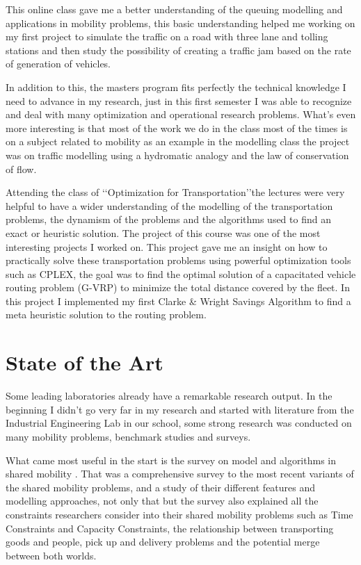 \documentclass{article}
\begin{document}
This online class gave me a better understanding of the queuing modelling and applications in mobility problems, this basic understanding helped me working on my first project to simulate the traffic on a road with three lane and tolling stations and then study the 
possibility of creating a traffic jam based on the rate of generation of vehicles.


In addition to this, the masters program fits perfectly the technical knowledge I need to advance in my research, just in this first semester I was able to recognize and deal with many optimization and operational research problems. 
What\rq{s} even more interesting is that most of the work we do in the class most of the times is on a subject related to mobility as an example in the modelling class the project was on traffic modelling using a hydromatic analogy and the law of conservation of flow.


Attending the class of \lq\lq{Optimization for Transportation}\rq\rq the lectures were very helpful to have a wider understanding of the modelling of the transportation problems, the dynamism of the problems and the algorithms used to find an exact or heuristic solution. 
The project of this course was one of the most interesting projects I worked on. This project gave me an insight on how to practically solve these transportation problems using powerful optimization tools such as CPLEX, the goal was to find the optimal solution of a capacitated vehicle routing problem (G-VRP) to minimize the total distance covered by the fleet. In this project I implemented my first Clarke \& Wright Savings Algorithm to find a meta heuristic solution to the routing problem.


\section{State of the Art}
\label{sec:literature}


Some leading laboratories already have a remarkable research output. In the beginning I didn\rq{t} go very far in my research and started with literature from the Industrial Engineering Lab in our school, some strong research was conducted on many mobility problems, benchmark studies and surveys. 

What came most useful in the start is the survey on model and algorithms in shared mobility \cite{MOURAD2019}. That was a comprehensive survey to the most recent variants of the shared mobility
problems, and a study of their different features and modelling approaches, not only that but the survey also explained all the constraints researchers consider into their shared mobility problems such as Time Constraints and Capacity Constraints, the relationship between transporting goods and people, pick up and delivery problems and the potential merge between both worlds. 
\end{document}
